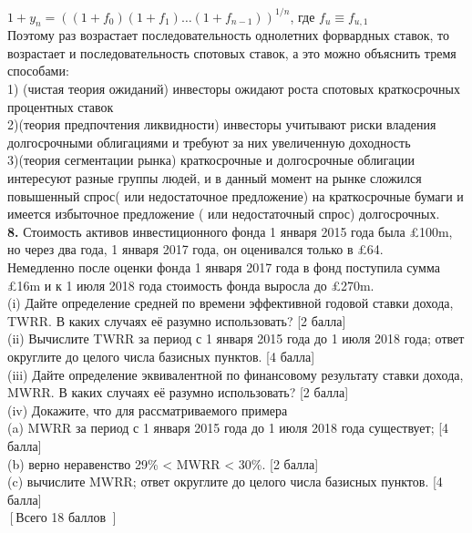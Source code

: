 \documentclass{article}
\begin{document}
$ \boxed { 1+y_n = ((1+f_0 )(1+f_1) \dots (1+f_{n-1}))^{1/n} }$, где $f_u  \equiv f_{u,1}$\\

Поэтому раз возрастает последовательность однолетних форвардных ставок, то возрастает и последовательность спотовых ставок, а это можно объяснить тремя способами:\\

1) (чистая теория ожиданий) инвесторы ожидают роста спотовых краткосрочных процентных ставок\\
2)(теория предпочтения ликвидности) инвесторы учитывают риски владения долгосрочными облигациями и требуют за них увеличенную доходность\\
3)(теория сегментации рынка) краткосрочные и долгосрочные облигации интересуют разные группы людей, и в данный момент на рынке сложился повышенный спрос( или недостаточное предложение)  на краткосрочные бумаги и имеется избыточное предложение ( или недостаточный спрос)  долгосрочных.\\




{\bf \large 8.}  Стоимость активов инвестиционного фонда 1 января 2015 года была £100m, но через два года, 1 января 2017 года, он оценивался только в £64.\\ Немедленно после оценки фонда 1 января 2017 года в фонд поступила сумма £16m и к 1 июля 2018 года стоимость фонда выросла до £270m.\\
(i) Дайте определение средней по времени эффективной годовой ставки дохода, TWRR. В каких случаях её разумно использовать? [2 балла]\\
(ii) Вычислите TWRR за период с 1 января 2015 года до 1 июля 2018 года; ответ округлите до целого числа базисных пунктов. [4 балла]\\
(iii) Дайте определение эквивалентной по финансовому результату ставки дохода, MWRR. В каких случаях её разумно использовать? [2 балла]\\
(iv) Докажите, что для рассматриваемого примера\\
(a) MWRR за период с 1 января 2015 года до 1 июля 2018 года существует; [4 балла]\\
(b) верно неравенство 29\% < MWRR < 30\%. [2 балла]\\
(c) вычислите MWRR; ответ округлите до целого числа базисных пунктов. [4 балла]\\
$\left[\right. $Всего 18 баллов $\left.\right]$\\
\end{document}
